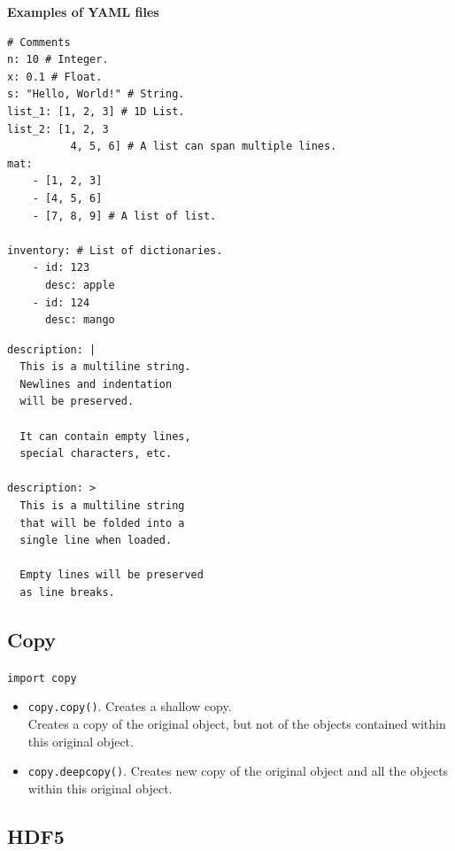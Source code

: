 \textbf{Examples of YAML files}

\begin{mdframed}[backgroundcolor=gray!10,linecolor=Firebrick4]
\begin{verbatim}
# Comments
n: 10 # Integer.
x: 0.1 # Float.
s: "Hello, World!" # String.
list_1: [1, 2, 3] # 1D List.
list_2: [1, 2, 3
          4, 5, 6] # A list can span multiple lines.
mat:
    - [1, 2, 3]
    - [4, 5, 6]
    - [7, 8, 9] # A list of list.

inventory: # List of dictionaries.
    - id: 123
      desc: apple
    - id: 124
      desc: mango

\end{verbatim}
\end{mdframed}

\columnbreak


\begin{mdframed}[backgroundcolor=gray!10,linecolor=Firebrick4]
\begin{verbatim}
description: |
  This is a multiline string.
  Newlines and indentation
  will be preserved.
  
  It can contain empty lines,
  special characters, etc.

description: >
  This is a multiline string
  that will be folded into a
  single line when loaded.
  
  Empty lines will be preserved
  as line breaks.
\end{verbatim}
\end{mdframed}



\subsection{Copy}

\texttt{import copy}

\begin{itemize}
\item \texttt{copy.copy()}. Creates a shallow copy.\\
        Creates a copy of the original object, 
        but not of the objects contained within this original object.\\
\item \texttt{copy.deepcopy()}. Creates new copy of the original object
        and all the objects within this original object.\\
\end{itemize}


\subsection{HDF5}

